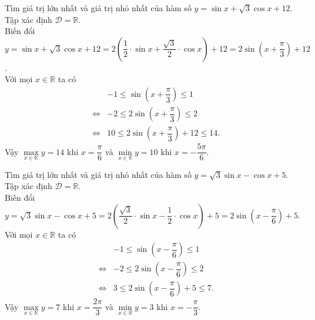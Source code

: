 \begin{bt}%
	Tìm giá trị lớn nhất và giá trị nhỏ nhất của hàm số $y=\sin x+\sqrt{3} \cos x+12$.
	\loigiai
	{Tập xác định $\mathscr{D}=\mathbb{R}$.\\
		Biến đổi $y=\sin x+\sqrt{3} \cos x+12=2\left(\dfrac{1}{2}\cdot\sin x+\dfrac{\sqrt{3}}{2}\cdot\cos x\right)+12=2\sin\left(x+\dfrac{\pi}{3}\right)+12$.\\
		Với mọi $x\in \mathbb{R}$ ta có
		\allowdisplaybreaks
		\begin{eqnarray*}
			& & -1\leq \sin\left(x+\dfrac{\pi}{3}\right)\leq 1\\
			&\Leftrightarrow& -2\leq 2\sin\left(x+\dfrac{\pi}{3}\right)\leq 2\\
			&\Leftrightarrow&10\leq  2\sin\left(x+\dfrac{\pi}{3}\right)+12\leq 14.
		\end{eqnarray*}
		Vậy $\max\limits_{x \in \mathbb{R}} y=14$ khi $x=\dfrac{\pi}{6}$ và $\min\limits_{x \in \mathbb{R}} y=10$ khi $x=-\dfrac{5\pi}{6}$.
	}
\end{bt}

\begin{bt}%
	Tìm giá trị lớn nhất và giá trị nhỏ nhất của hàm số $y=\sqrt{3} \sin x-\cos x+5$.
	\loigiai
	{
		Tập xác định $\mathscr{D}=\mathbb{R}$.\\
		Biến đổi $y=\sqrt{3} \sin x-\cos x+5=2\left(\dfrac{\sqrt{3}}{2}\cdot\sin x-\dfrac{1}{2}\cdot\cos x\right)+5=2\sin\left(x-\dfrac{\pi}{6}\right)+5$.\\
		Với mọi $x\in \mathbb{R}$ ta có
		\allowdisplaybreaks
		\begin{eqnarray*}
			& & -1\leq \sin\left(x-\dfrac{\pi}{6}\right)\leq 1\\
			&\Leftrightarrow& -2\leq 2\sin\left(x-\dfrac{\pi}{6}\right)\leq 2\\
			&\Leftrightarrow&3\leq  2\sin\left(x-\dfrac{\pi}{6}\right)+5\leq 7.
		\end{eqnarray*}
		Vậy $\max\limits_{x \in \mathbb{R}} y=7$ khi $x=\dfrac{2\pi}{3}$ và $\min\limits_{x \in \mathbb{R}} y=3$ khi $x=-\dfrac{\pi}{3}$.
	}
\end{bt}

